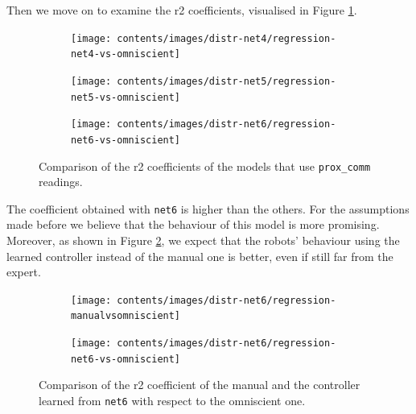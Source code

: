 Then we move on to examine the \gls{r2} coefficients, visualised in Figure 
\ref{fig:net456r2}.
\begin{figure}[!htb]
	\begin{center}
		\begin{subfigure}[h]{0.47\textwidth}
			\texttt{[image: contents/images/distr-net4/regression-net4-vs-omniscient]}%
		\end{subfigure}
		\hfill
		\begin{subfigure}[h]{0.47\textwidth}
			\texttt{[image: contents/images/distr-net5/regression-net5-vs-omniscient]}%
		\end{subfigure}
	\end{center}
	\begin{center}
		\begin{subfigure}[h]{0.47\textwidth}
			\texttt{[image: contents/images/distr-net6/regression-net6-vs-omniscient]}
		\end{subfigure}
	\end{center}
	\caption[Comparison of the \gls{r2} coefficient for \texttt{prox\_comm} 
	readings.]{Comparison of the \gls{r2} coefficients of the models that use 
	\texttt{prox\_comm} readings.}
	\label{fig:net456r2}
\end{figure}

The coefficient obtained with \texttt{net6} is higher than the others. For the 
assumptions made before we believe that the behaviour of this model is more 
promising. Moreover, as shown in Figure \ref{fig:net6r2}, we expect that the 
robots’ behaviour using the learned controller instead of the manual one is 
better, even if still far from the expert.

\begin{figure}[!htb]
	\centering
	\begin{subfigure}[h]{0.49\textwidth}
		\centering
		\texttt{[image: contents/images/distr-net6/regression-manualvsomniscient]}%
	\end{subfigure}
	\hfill
	\begin{subfigure}[h]{0.49\textwidth}
		\centering
		\texttt{[image: contents/images/distr-net6/regression-net6-vs-omniscient]}
	\end{subfigure}
	\caption[Evaluation of the \gls{r2} coefficient of \texttt{net6} .]{Comparison of 
	the \gls{r2} coefficient of the manual and the controller 
	learned from \texttt{net6} with respect to the omniscient one.}
	\label{fig:net6r2}
\end{figure}

